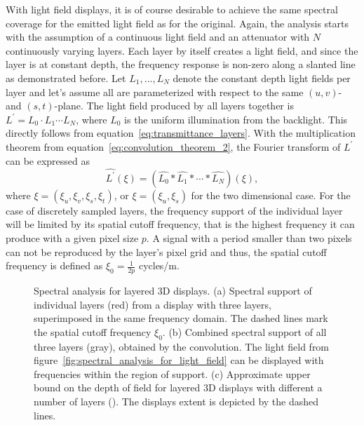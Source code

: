 With light field displays, it is of course desirable to achieve the same spectral coverage for the emitted light field as for the original.
Again, the analysis starts with the assumption of a continuous light field and an attenuator with $N$ continuously varying layers.
Each layer by itself creates a light field, and since the layer is at constant depth, the frequency response is non-zero along a slanted line as demonstrated before.
Let $L_1, \dots , L_N$ denote the constant depth light fields per layer and let's assume all are parameterized with respect to the same $(u, v)$- and \mbox{$(s, t)$-plane}.
The light field produced by all layers together is $L^\prime = L_0 \cdot L_1 \cdots L_N$, where $L_0$ is the uniform illumination from the backlight.
This directly follows from equation~\ref{eq:transmittance_layers}.
With the multiplication theorem from equation~\ref{eq:convolution_theorem_2}, the Fourier transform of $L^\prime$ can be expressed as
\begin{equation}\label{eq:convolution_of_layers}
	\widehat{L^\prime}(\xi) = (\widehat{L_0} \ast \widehat{L_1} \ast \cdots \ast \widehat{L_N}) (\xi), 
\end{equation}
where $\xi = (\xi_u, \xi_v, \xi_s, \xi_t)$, or $\xi = (\xi_u, \xi_s)$ for the two dimensional case.
For the case of discretely sampled layers, the frequency support of the individual layer will be limited by its spatial cutoff frequency, that is the highest frequency it can produce with a given pixel size $p$.
A signal with a period smaller than two pixels can not be reproduced by the layer's pixel grid and thus, the spatial cutoff frequency is defined as $\xi_0 = \frac{1}{2p}$ cycles/m.
\begin{figure}[tb]
	\begin{subfigure}[b]{.3\textwidth}
		\centering
		
		\caption{}
		\label{fig:3_layers}
		
		\caption{}
		\label{fig:3_layes_convolution}
	\end{subfigure}%
	\hfill
	\begin{subfigure}[b]{.7\textwidth}
		\centering
		
		\caption{}
		\label{fig:cut-off-frequency_N_layers}
	\end{subfigure}%
	\caption[Spectral analysis for layered 3D displays]
			{Spectral analysis for layered 3D displays. 
			 (a) Spectral support of individual layers (red) from a display with three layers, superimposed in the same frequency domain.
			 The dashed lines mark the spatial cutoff frequency $\xi_0$.
			 (b) Combined spectral support of all three layers (gray), obtained by the convolution. 
			 The light field from figure~\ref{fig:spectral_analysis_for_light_field} can be displayed with frequencies within the region of support.
			 (c) Approximate upper bound on the depth of field for layered 3D displays with different a number of layers (\cite{WetzsteinTomo}).
			 The displays extent is depicted by the dashed lines.}
	\label{fig:spectral_analysis_of_display}
\end{figure}
